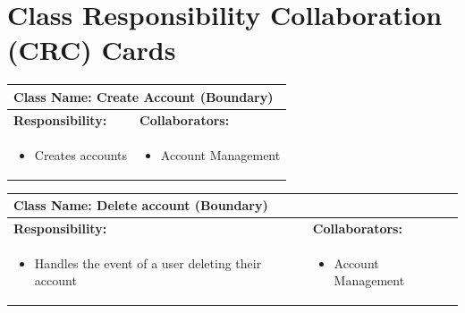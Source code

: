 \documentclass[]{article}
\begin{document}
\section{Class Responsibility Collaboration (CRC) Cards}
\label{sec:class_responsibility_collaboration_crc_cards}

\begin{table}[H]
	\centering
	\begin{tabular}{|p{7cm}|p{7cm}|}
	\hline 
	 \multicolumn{2}{|l|}{\textbf{Class Name:} Create Account (Boundary)} \\
	\hline
	\textbf{Responsibility:} & \textbf{Collaborators:} \\
	\hline
	\raggedright
	\begin{itemize}
		\item Creates accounts
	\end{itemize}
	\vspace{1in} & 
	\begin{itemize}
		\item Account Management
	\end{itemize} \\
	\hline
	\end{tabular}
\end{table}

\begin{table}[H]
	\centering
	\begin{tabular}{|p{7cm}|p{7cm}|}
	\hline 
	 \multicolumn{2}{|l|}{\textbf{Class Name:} Delete account (Boundary)} \\
	\hline
	\textbf{Responsibility:} & \textbf{Collaborators:} \\
	\hline
	\raggedright
	\begin{itemize}
		\item Handles the event of a user deleting their account
	\end{itemize}
	\vspace{1in} & 
	\begin{itemize}
		\item Account Management
	\end{itemize} \\
	\hline
	\end{tabular}
\end{table}
\end{document}
